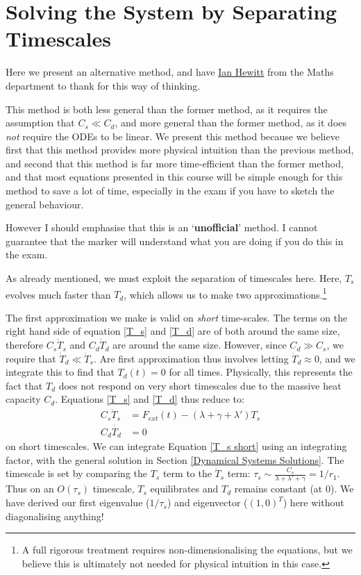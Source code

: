 \section{Solving the System by Separating Timescales}\label{Hewitt Method}

Here we present an alternative method, and have \href{https://people.maths.ox.ac.uk/hewitt/}{Ian Hewitt} from the Maths department to thank for this way of thinking. 

This method is both less general than the former method, as it requires the assumption that $C_s\ll C_d$, and more general than the former method, as it does \textit{not} require the ODEs to be linear. We present this method because we believe first that this method provides more physical intuition than the previous method, and second that this method is far more time-efficient than the former method, and that most equations presented in this course will be simple enough for this method to save a lot of time, especially in the exam if you have to sketch the general behaviour.

However I should emphasise that this is an `\textbf{unofficial}' method. I cannot guarantee that the marker will understand what you are doing if you do this in the exam.

As already mentioned, we must exploit the separation of timescales here. Here, $T_s$ evolves much faster than $T_d$, which allows us to make two approximations.\footnote{A full rigorous treatment requires non-dimensionalising the equations, but we believe this is ultimately not needed for physical intuition in this case.}

The first approximation we make is valid on \textit{short} time-scales. The terms on the right hand side of equation \ref{T_s} and \ref{T_d} are of both around the same size, therefore $C_s\dot T_s$ and $C_d\dot T_d$ are around the same size. However, since $C_d\gg C_s$, we require that $\dot T_d\ll \dot T_s$. Are first approximation thus involves letting $\dot T_d\approx0$, and we integrate this to find that $T_d(t)=0$ for all times. Physically, this represents the fact that $T_d$ does not respond on very short timescales due to the massive heat capacity $C_d$. Equations \ref{T_s} and \ref{T_d} thus reduce to:
\begin{align}
    \label{T_s short}
    C_s\dot T_s &=F_{ext}(t)-(\lambda +\gamma+ \lambda')T_s\\ 
    \label{T_d short}
    C_d \dot{T_d} &= 0
\end{align}
on short timescales. We can integrate Equation \ref{T_s short} using an integrating factor, with the general solution in Section \ref{Dynamical Systems Solutions}. The timescale is set by comparing the $T_s$ term to the $\dot T_s$ term: $\tau_s\sim \frac{C_s}{\lambda+\lambda'+\gamma}=1/r_1$. Thus on an $O(\tau_s)$ timescale, $T_s$ equilibrates and $T_d$ remains constant (at $0$). We have derived our first eigenvalue ($1/\tau_s$) and eigenvector ($(1,0)^T$) here without diagonalising anything!

